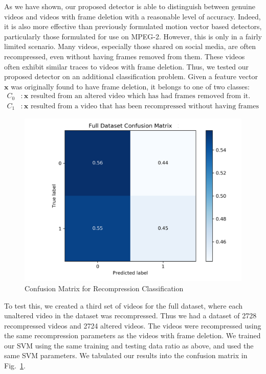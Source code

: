 As we have shown, our proposed detector is able to distinguish between genuine videos and videos with frame deletion with a reasonable level of accuracy. Indeed, it is also more effective than previously formulated motion vector based detectors, particularly those formulated for use on MPEG-2. However, this is only in a fairly limited scenario. Many videos, especially those shared on social media, are often recompressed, even without having frames removed from them. These videos often exhibit similar traces to videos with frame deletion. Thus, we tested our proposed detector on an additional classification problem. Given a feature vector $\bm{x}$ was originally found to have frame deletion, it belongs to one of two classes:%
%
\begin{equation}
\begin{aligned}
  C_{0} &: \bm{x} \text{ resulted from an altered video which has had frames removed from it.} \\
  C_{1} &: \bm{x} \text{ resulted from a video that has been recompressed without having frames removed.}
\end{aligned}
\end{equation}
%
\begin{figure}[htbp]
\centerline{\includegraphics[width=0.67\linewidth]{ExperimentalResults/normal_cm.png}}
\caption{Confusion Matrix for Recompression Classification}
\label{normalcm}
\end{figure}

To test this, we created a third set of videos for the full dataset, where each unaltered video in the dataset was recompressed. Thus we had a dataset of 2728 recompressed videos and 2724 altered videos. The videos were recompressed using the same recompression parameters as the videos with frame deletion. We trained our SVM using the same training and testing data ratio as above, and used the same SVM parameters. We tabulated our results into the confusion matrix in Fig.~\ref{normalcm}.

